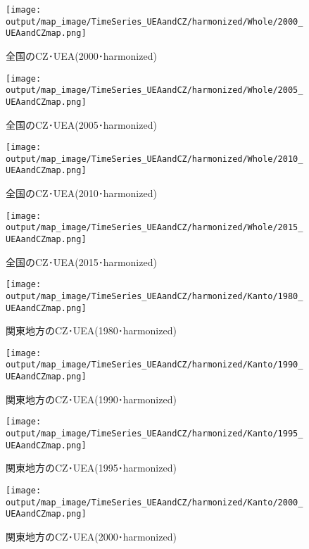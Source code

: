 \documentclass{ltjsarticle}
\begin{document}
  \begin{figure}[pbth]
    \centering
    \texttt{[image: output/map\_image/TimeSeries\_UEAandCZ/harmonized/Whole/2000\_UEAandCZmap.png]}
    \caption{\label{ham:tsA2000}全国のCZ･UEA(2000･harmonized)}
  \end{figure}
  
  \begin{figure}[pbth]
    \centering
    \texttt{[image: output/map\_image/TimeSeries\_UEAandCZ/harmonized/Whole/2005\_UEAandCZmap.png]}
    \caption{\label{ham:tsA2005}全国のCZ･UEA(2005･harmonized)}
  \end{figure}
  
  \begin{figure}[pbth]
    \centering
    \texttt{[image: output/map\_image/TimeSeries\_UEAandCZ/harmonized/Whole/2010\_UEAandCZmap.png]}
    \caption{\label{ham:tsA2010}全国のCZ･UEA(2010･harmonized)}
  \end{figure}
  
  \begin{figure}[pbth]
    \centering
    \texttt{[image: output/map\_image/TimeSeries\_UEAandCZ/harmonized/Whole/2015\_UEAandCZmap.png]}
    \caption{\label{ham:tsA2015}全国のCZ･UEA(2015･harmonized)}
  \end{figure}


  \begin{figure}[pbth]
    \centering
    \texttt{[image: output/map\_image/TimeSeries\_UEAandCZ/harmonized/Kanto/1980\_UEAandCZmap.png]}
    \caption{\label{ham:tsK1980}関東地方のCZ･UEA(1980･harmonized)}
  \end{figure}
  
  \begin{figure}[pbth]
    \centering
    \texttt{[image: output/map\_image/TimeSeries\_UEAandCZ/harmonized/Kanto/1990\_UEAandCZmap.png]}
    \caption{\label{ham:tsK1990}関東地方のCZ･UEA(1990･harmonized)}
  \end{figure}
  
  \begin{figure}[pbth]
    \centering
    \texttt{[image: output/map\_image/TimeSeries\_UEAandCZ/harmonized/Kanto/1995\_UEAandCZmap.png]}
    \caption{\label{ham:tsK1995}関東地方のCZ･UEA(1995･harmonized)}
  \end{figure}
  
  \begin{figure}[pbth]
    \centering
    \texttt{[image: output/map\_image/TimeSeries\_UEAandCZ/harmonized/Kanto/2000\_UEAandCZmap.png]}
    \caption{\label{ham:tsK2000}関東地方のCZ･UEA(2000･harmonized)}
  \end{figure}
  
\end{document}
